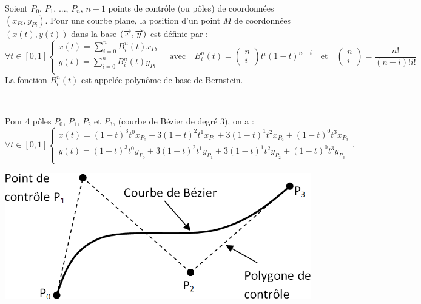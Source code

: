 \documentclass[10pt,fleqn]{article} %
\begin{document}
\begin{defi}
Soient $P_0$, $P_1$, ..., $P_{n}$, $n+1$ points de contrôle (ou pôles) de coordonnées $\left( x_{Pi},y_{Pi} \right)$. %
Pour une courbe plane, la position d'un point $M$ de coordonnées $\left( x(t),y(t) \right)$ dans la base $\left(\overrightarrow{x},\overrightarrow{y} \right)$ est définie par :
$$
\forall t \in [0,1]
\left\{
\begin{array}{l}
x(t)= \sum\limits_{i=0}^{n} B_i^n(t) x_{Pi} \\
y(t)= \sum\limits_{i=0}^{n} B_i^n(t) y_{Pi} \\
\end{array}
\right.
\quad \text{avec} \quad B_i^n(t) = \begin{pmatrix} n \\ i\end{pmatrix} t^i \left(1-t\right)^{n-i}
\quad \text{et} \quad  \begin{pmatrix} n \\ i\end{pmatrix} = \dfrac{n!}{\left(n-i \right) ! i !}
$$
La fonction $B_i^n(t)$ est appelée polynôme de base de Bernstein.
\end{defi}

\begin{exemple}~\\
\begin{minipage}[c]{0.7\linewidth}
Pour 4 pôles $P_0$, $P_1$, $P_2$ et $P_3$, (courbe de Bézier de degré 3), on a : 
$$
\forall t \in [0,1]
\left\{
\begin{array}{l}
x(t)=  \left(1-t \right)^3 t^0 x_{P_0} +3\left(1-t \right)^2 t^1 x_{P_1} +3\left(1-t \right)^1 t^2 x_{P_2} +\left(1-t \right)^0 t^3 x_{P_3}\\
y(t)=  \left(1-t \right)^3 t^0 y_{P_0} +3\left(1-t \right)^2 t^1 y_{P_1} +3\left(1-t \right)^1 t^2 y_{P_2} +\left(1-t \right)^0 t^3 y_{P_3}\\
\end{array}
\right..
$$ 
\end{minipage} \hfill
\begin{minipage}[c]{0.27\linewidth}
\includegraphics[width=\linewidth]{images/Courbe}
\end{minipage}
\end{exemple}
\end{document}
